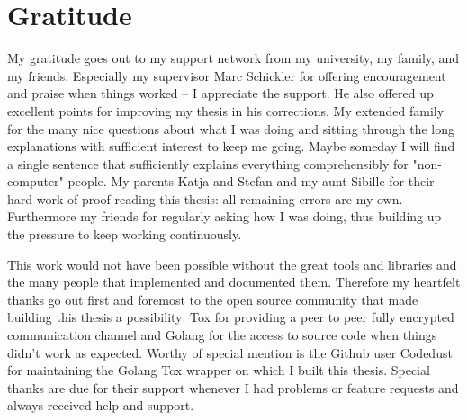 \section*{Gratitude}
\label{chap:gratitude}

My gratitude goes out to my support network from my university, my family, and my friends.
Especially my supervisor Marc Schickler for offering encouragement and praise when things worked -- I appreciate the support.
He also offered up excellent points for improving my thesis in his corrections.
My extended family for the many nice questions about what I was doing and sitting through the long explanations with sufficient interest to keep me going.
Maybe someday I will find a single sentence that sufficiently explains everything comprehensibly for "non-computer" people.
My parents Katja and Stefan and my aunt Sibille for their hard work of proof reading this thesis: all remaining errors are my own.
Furthermore my friends for regularly asking how I was doing, thus building up the pressure to keep working continuously.

This work would not have been possible without the great tools and libraries and the many people that implemented and documented them.
Therefore my heartfelt thanks go out first and foremost to the open source community that made building this thesis a possibility: Tox for providing a peer to peer fully encrypted communication channel and Golang for the access to source code when things didn't work as expected.
Worthy of special mention is the Github user Codedust for maintaining the Golang Tox wrapper on which I built this thesis.
Special thanks are due for their support whenever I had problems or feature requests and always received help and support.
